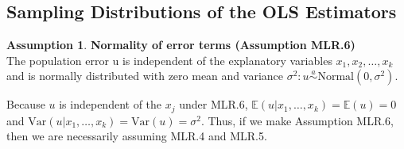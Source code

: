 \documentclass[a4paper, 10pt]{article}
\theoremstyle{definition}	%
\newtheorem{assumption}{Assumption}
\begin{document}
\subsection{Sampling Distributions of the OLS Estimators}
\begin{assumption}
    \textbf{Normality of error terms (Assumption MLR.6)}\\
    The population error u is independent of the explanatory variables $x_1, x_2, \ldots, x_k$ and is normally distributed with zero mean and variance 
    $\sigma^2: u \overset{a}{\sim}\text{Normal}(0,\sigma^2)$.
\end{assumption}
Because $u$ is independent of the $x_j$ under MLR.6, $\mathbb{E}(u|x_1, \dots, x_k) = \mathbb{E}(u) = 0$ and $\text{Var}(u | x_1, \dots, x_k) = \text{Var}(u) = \sigma^2$. Thus, if we make Assumption MLR.6, then we are necessarily assuming MLR.4 and MLR.5.
\end{document}
